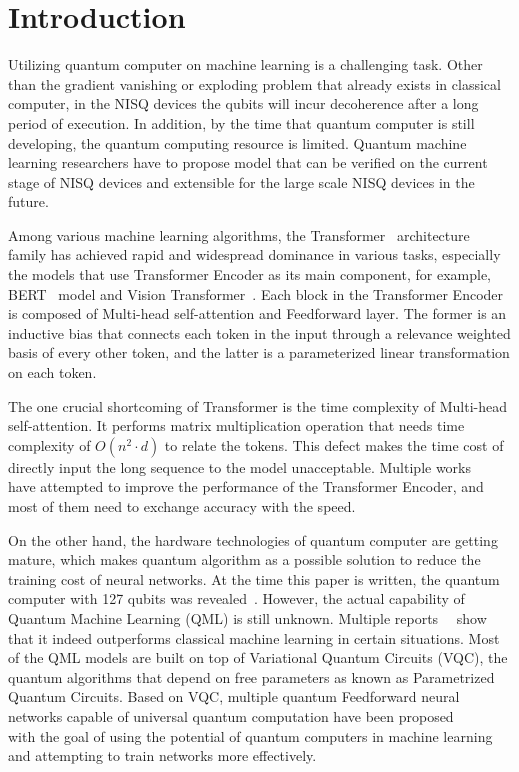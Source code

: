 \section{Introduction}

Utilizing quantum computer on machine learning is a challenging task. Other than the gradient vanishing or exploding problem that already exists in classical computer, in the NISQ devices the qubits will incur decoherence after a long period of execution. In addition, by the time that quantum computer is still developing, the quantum computing resource is limited. Quantum machine learning researchers have to propose model that can be verified on the current stage of NISQ devices and extensible for the large scale NISQ devices in the future.

Among various machine learning algorithms, the Transformer~\cite{NIPS2017_3f5ee243} architecture family has achieved rapid and widespread dominance in various tasks, especially the models that use Transformer Encoder as its main component, for example, BERT~\cite{devlin2018bert} model and Vision Transformer~\cite{dosovitskiy2021an}. Each block in the Transformer Encoder is composed of Multi-head self-attention and Feedforward layer. The former is an inductive bias that connects each token in the input through a relevance weighted basis of every other token, and the latter is a parameterized linear transformation on each token.

The one crucial shortcoming of Transformer is the time complexity of Multi-head self-attention. It performs matrix multiplication operation that needs time complexity of $O(n^2 \cdot d)$ to relate the tokens. This defect makes the time cost of directly input the long sequence to the model unacceptable. Multiple works~\cite{arxiv.2006.04768}~\cite{tolstikhin2021mlp}~\cite{melas2021you}~\cite{DBLP:journals/corr/abs-2105-03824}~\cite{NEURIPS2021_4cc05b35} have attempted to improve the performance of the Transformer Encoder, and most of them need to exchange accuracy with the speed.

On the other hand, the hardware technologies of quantum computer are getting mature, which makes quantum algorithm as a possible solution to reduce the training cost of neural networks. At the time this paper is written, the quantum computer with 127 qubits was revealed~\cite{chow2021ibm}. However, the actual capability of Quantum Machine Learning (QML) is still unknown. Multiple reports~\cite{huang2022quantum}~\cite{schuld2022quantum} show that it indeed outperforms classical machine learning in certain situations. Most of the QML models are built on top of Variational Quantum Circuits (VQC), the quantum algorithms that depend on free parameters as known as Parametrized Quantum Circuits. Based on VQC, multiple quantum Feedforward neural networks capable of universal quantum computation have been proposed~\cite{schuld2014quest}~\cite{wan2017quantum}~\cite{farhi2018classification}~\cite{mitarai2018quantum}~\cite{beer2020training} with the goal of using the potential of quantum computers in machine learning and attempting to train networks more effectively.

